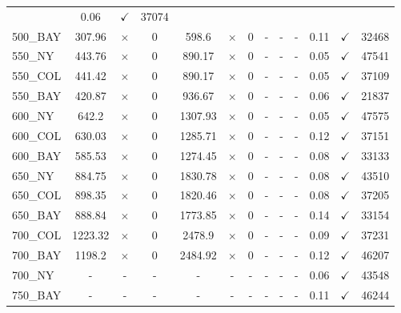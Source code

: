 \documentclass[main.tex]{subfiles}
\begin{document}
\begin{landscape}
\begin{center}
\begin{tabular}{lcccccccccccc}
 & 0.06 & $\checkmark$ & 37074\\
500\_BAY & 307.96 & $\times$ & 0 & 598.6 & $\times$ & 0 & - & - & - 
 & 0.11 & $\checkmark$ & 32468\\
550\_NY & 443.76 & $\times$ & 0 & 890.17 & $\times$ & 0 & - & - & - 
 & 0.05 & $\checkmark$ & 47541\\
550\_COL & 441.42 & $\times$ & 0 & 890.17 & $\times$ & 0 & - & - & - 
 & 0.05 & $\checkmark$ & 37109\\
550\_BAY & 420.87 & $\times$ & 0 & 936.67 & $\times$ & 0 & - & - & - 
 & 0.06 & $\checkmark$ & 21837\\
600\_NY & 642.2 & $\times$ & 0 & 1307.93 & $\times$ & 0 & - & - & - 
 & 0.05 & $\checkmark$ & 47575\\
600\_COL & 630.03 & $\times$ & 0 & 1285.71 & $\times$ & 0 & - & - & - 
 & 0.12 & $\checkmark$ & 37151\\
600\_BAY & 585.53 & $\times$ & 0 & 1274.45 & $\times$ & 0 & - & - & - 
 & 0.08 & $\checkmark$ & 33133\\
650\_NY & 884.75 & $\times$ & 0 & 1830.78 & $\times$ & 0 & - & - & - 
 & 0.08 & $\checkmark$ & 43510\\
650\_COL & 898.35 & $\times$ & 0 & 1820.46 & $\times$ & 0 & - & - & - 
 & 0.08 & $\checkmark$ & 37205\\
650\_BAY & 888.84 & $\times$ & 0 & 1773.85 & $\times$ & 0 & - & - & - 
 & 0.14 & $\checkmark$ & 33154\\
700\_COL & 1223.32 & $\times$ & 0 & 2478.9 & $\times$ & 0 & - & - & - 
 & 0.09 & $\checkmark$ & 37231\\
700\_BAY & 1198.2 & $\times$ & 0 & 2484.92 & $\times$ & 0 & - & - & - 
 & 0.12 & $\checkmark$ & 46207\\
700\_NY & - & - & - 
 & - & - & - 
 & - & - & - 
 & 0.06 & $\checkmark$ & 43548\\
750\_BAY & - & - & - 
 & - & - & - 
 & - & - & - 
 & 0.11 & $\checkmark$ & 46244\\
\hline\end{tabular}
\end{center}
\end{landscape}
\newpage
\end{document}
